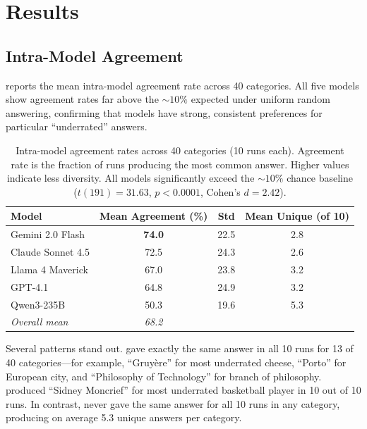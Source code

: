 \section{Results}
\label{sec:results}

\subsection{Intra-Model Agreement}
\label{sec:intra}

 reports the mean intra-model agreement rate across 40 categories. All five models show agreement rates far above the ${\sim}10\%$ expected under uniform random answering, confirming that models have strong, consistent preferences for particular ``underrated'' answers.

\begin{table}[t]
    \centering
    \caption{Intra-model agreement rates across 40 categories (10 runs each). Agreement rate is the fraction of runs producing the most common answer. Higher values indicate less diversity. All models significantly exceed the ${\sim}10\%$ chance baseline ($t(191) = 31.63$, $p < 0.0001$, Cohen's $d = 2.42$).}
    \begin{tabular}{@{}lccc@{}}
        \toprule
        \textbf{Model} & \textbf{Mean Agreement (\%)} & \textbf{Std} & \textbf{Mean Unique (of 10)} \\
        \midrule
        Gemini 2.0 Flash & \textbf{74.0} & 22.5 & 2.8 \\
        Claude Sonnet 4.5 & 72.5 & 24.3 & 2.6 \\
        Llama 4 Maverick & 67.0 & 23.8 & 3.2 \\
        GPT-4.1 & 64.8 & 24.9 & 3.2 \\
        Qwen3-235B & 50.3 & 19.6 & 5.3 \\
        \midrule
        \textit{Overall mean} & \textit{68.2} & & \\
        \bottomrule
    \end{tabular}
    \label{tab:intra}
\end{table}

Several patterns stand out. \claude gave exactly the same answer in all 10 runs for 13 of 40 categories---for example, ``Gruy\`{e}re'' for most underrated cheese, ``Porto'' for European city, and ``Philosophy of Technology'' for branch of philosophy. \gptfour produced ``Sidney Moncrief'' for most underrated basketball player in 10 out of 10 runs. In contrast, \qwen never gave the same answer for all 10 runs in any category, producing on average 5.3 unique answers per category.

